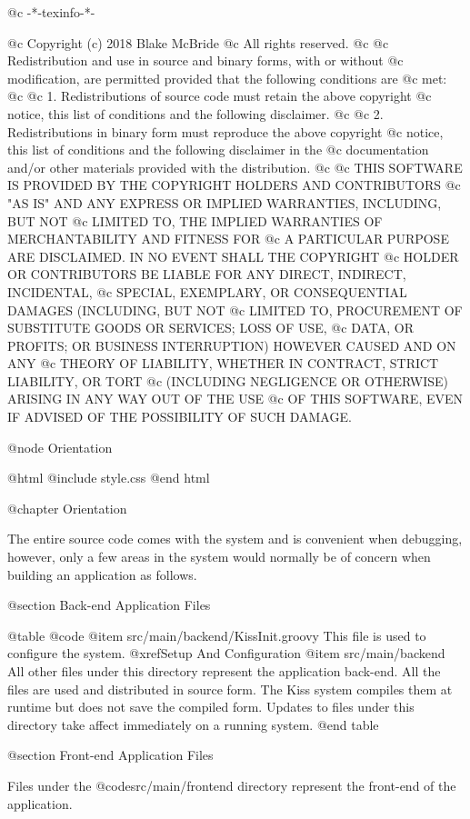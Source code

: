 @c -*-texinfo-*-

@c  Copyright (c) 2018 Blake McBride
@c  All rights reserved.
@c
@c  Redistribution and use in source and binary forms, with or without
@c  modification, are permitted provided that the following conditions are
@c  met:
@c
@c  1. Redistributions of source code must retain the above copyright
@c  notice, this list of conditions and the following disclaimer.
@c
@c  2. Redistributions in binary form must reproduce the above copyright
@c  notice, this list of conditions and the following disclaimer in the
@c  documentation and/or other materials provided with the distribution.
@c
@c  THIS SOFTWARE IS PROVIDED BY THE COPYRIGHT HOLDERS AND CONTRIBUTORS
@c  "AS IS" AND ANY EXPRESS OR IMPLIED WARRANTIES, INCLUDING, BUT NOT
@c  LIMITED TO, THE IMPLIED WARRANTIES OF MERCHANTABILITY AND FITNESS FOR
@c  A PARTICULAR PURPOSE ARE DISCLAIMED. IN NO EVENT SHALL THE COPYRIGHT
@c  HOLDER OR CONTRIBUTORS BE LIABLE FOR ANY DIRECT, INDIRECT, INCIDENTAL,
@c  SPECIAL, EXEMPLARY, OR CONSEQUENTIAL DAMAGES (INCLUDING, BUT NOT
@c  LIMITED TO, PROCUREMENT OF SUBSTITUTE GOODS OR SERVICES; LOSS OF USE,
@c  DATA, OR PROFITS; OR BUSINESS INTERRUPTION) HOWEVER CAUSED AND ON ANY
@c  THEORY OF LIABILITY, WHETHER IN CONTRACT, STRICT LIABILITY, OR TORT
@c  (INCLUDING NEGLIGENCE OR OTHERWISE) ARISING IN ANY WAY OUT OF THE USE
@c  OF THIS SOFTWARE, EVEN IF ADVISED OF THE POSSIBILITY OF SUCH DAMAGE.


@node Orientation

@html
@include style.css
@end html

@chapter Orientation


The entire source code comes with the system and is convenient when
debugging, however, only a few areas in the system would normally be
of concern when building an application as follows.


@section Back-end Application Files

@table @code
@item src/main/backend/KissInit.groovy
This file is used to configure the system. @xref{Setup And Configuration}
@item src/main/backend
All other files under this directory represent the application
back-end.  All the files are used and distributed in source form.  The
Kiss system compiles them at runtime but does not save the compiled form.
Updates to files under this directory take affect
immediately on a running system.
@end table


@section Front-end Application Files

Files under the @code{src/main/frontend} directory represent the
front-end of the application.

